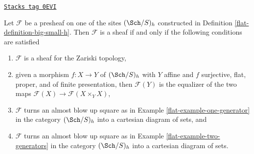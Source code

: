 \begin{lemma}
\label{flat-lemma-refine-check-h}
\href{https://stacks.math.columbia.edu/tag/0EVI}{\texttt{Stacks tag 0EVI}}

Let $\mathcal{F}$ be a presheaf on one of the sites $(\Sch/S)_h$
constructed in Definition \ref{flat-definition-big-small-h}.
Then $\mathcal{F}$ is a sheaf if and only if the following
conditions are satisfied
\begin{enumerate}
\item $\mathcal{F}$ is a sheaf for the Zariski topology,
\item given a morphism $f : X \to Y$ of $(\Sch/S)_h$ with $Y$ affine
and $f$ surjective, flat, proper, and of finite presentation, then
$\mathcal{F}(Y)$ is the equalizer of the two maps
$\mathcal{F}(X) \to \mathcal{F}(X \times_Y X)$,
\item $\mathcal{F}$ turns an almost blow up square as in
Example \ref{flat-example-one-generator} in the category $(\Sch/S)_h$
into a cartesian diagram of sets, and
\item $\mathcal{F}$ turns an almost blow up square as in
Example \ref{flat-example-two-generators} in the category $(\Sch/S)_h$
into a cartesian diagram of sets.
\end{enumerate}
\end{lemma}


